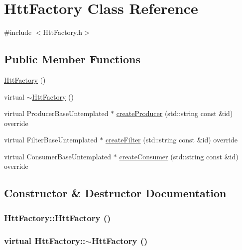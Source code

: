 \hypertarget{classHttFactory}{
\section{HttFactory Class Reference}
\label{classHttFactory}
}


{\ttfamily \#include $<$HttFactory.h$>$}\subsection*{Public Member Functions}
\begin{DoxyCompactItemize}
\item 
\hyperlink{classHttFactory_a3a22fb86a999d7c032e6513f5c947cd8}{HttFactory} ()
\item 
virtual \hyperlink{classHttFactory_ac0ea50adb9016fde66721e17414bf454}{$\sim$HttFactory} ()
\item 
virtual ProducerBaseUntemplated $\ast$ \hyperlink{classHttFactory_a7534ea6a4c650c35f40b6b6912383acc}{createProducer} (std::string const \&id) override
\item 
virtual FilterBaseUntemplated $\ast$ \hyperlink{classHttFactory_a67a1f724bd23197f6c03bb2ecee45e0a}{createFilter} (std::string const \&id) override
\item 
virtual ConsumerBaseUntemplated $\ast$ \hyperlink{classHttFactory_a5de496e354133732b209062e224ebf9f}{createConsumer} (std::string const \&id) override
\end{DoxyCompactItemize}


\subsection{Constructor \& Destructor Documentation}
\hypertarget{classHttFactory_a3a22fb86a999d7c032e6513f5c947cd8}{
\subsubsection[{HttFactory}]{\setlength{\rightskip}{0pt plus 5cm}HttFactory::HttFactory ()}}
\label{classHttFactory_a3a22fb86a999d7c032e6513f5c947cd8}
\hypertarget{classHttFactory_ac0ea50adb9016fde66721e17414bf454}{
\subsubsection[{$\sim$HttFactory}]{\setlength{\rightskip}{0pt plus 5cm}virtual HttFactory::$\sim$HttFactory ()}}
\label{classHttFactory_ac0ea50adb9016fde66721e17414bf454}


